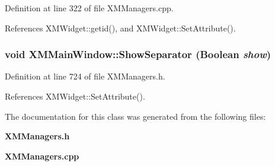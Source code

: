Definition at line 322 of file XMManagers.cpp.

References XMWidget::getid(), and XMWidget::Set\-Attribute().
\subsubsection{\setlength{\rightskip}{0pt plus 5cm}void XMMain\-Window::Show\-Separator (Boolean {\em show})\hspace{0.3cm}{\tt  [inline]}}\label{classXMMainWindow_a6}




Definition at line 724 of file XMManagers.h.

References XMWidget::Set\-Attribute().

The documentation for this class was generated from the following files:\begin{CompactItemize}
\item 
{\bf XMManagers.h}\item 
{\bf XMManagers.cpp}\end{CompactItemize}
